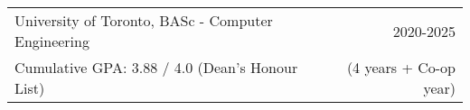 \begin{tabularx}{\textwidth}{ @{}X r@{} }
    University of Toronto, BASc - Computer Engineering & 2020-2025 \\
    Cumulative GPA: 3.88 / 4.0 (Dean’s Honour List) & (4 years + Co-op year) \\
\end{tabularx}